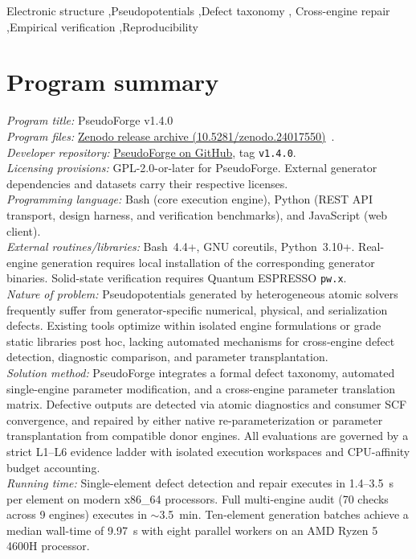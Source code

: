 \documentclass[3p,twocolumn]{elsarticle}
\begin{document}
\begin{frontmatter}
\begin{keyword}
Electronic structure \sep Pseudopotentials \sep Defect taxonomy \sep
Cross-engine repair \sep Empirical verification \sep Reproducibility
\end{keyword}
\end{frontmatter}

\section*{Program summary}
\begingroup\small\raggedright
\noindent\textit{Program title:} PseudoForge v1.4.0\\
\textit{Program files:} \href{https://doi.org/10.5281/zenodo.24017550}{Zenodo release archive (10.5281/zenodo.24017550)}~\cite{pseudoforge}.\\
\textit{Developer repository:} \href{https://github.com/MHAmirkhani/PseudoForge/tree/v1.4.0}{PseudoForge on GitHub}, tag \texttt{v1.4.0}.\\
\textit{Licensing provisions:} GPL-2.0-or-later for PseudoForge. External generator dependencies and datasets carry their respective licenses.\\
\textit{Programming language:} Bash (core execution engine), Python (REST API transport, design harness, and verification benchmarks), and JavaScript (web client).\\
\textit{External routines/libraries:} Bash~4.4+, GNU coreutils, Python~3.10+. Real-engine generation requires local installation of the corresponding generator binaries. Solid-state verification requires Quantum ESPRESSO \texttt{pw.x}.\\
\textit{Nature of problem:} Pseudopotentials generated by heterogeneous atomic solvers frequently suffer from generator-specific numerical, physical, and serialization defects. Existing tools optimize within isolated engine formulations or grade static libraries post hoc, lacking automated mechanisms for cross-engine defect detection, diagnostic comparison, and parameter transplantation.\\
\textit{Solution method:} PseudoForge integrates a formal defect taxonomy, automated single-engine parameter modification, and a cross-engine parameter translation matrix. Defective outputs are detected via atomic diagnostics and consumer SCF convergence, and repaired by either native re-parameterization or parameter transplantation from compatible donor engines. All evaluations are governed by a strict L1--L6 evidence ladder with isolated execution workspaces and CPU-affinity budget accounting.\\
\textit{Running time:} Single-element defect detection and repair executes in 1.4--3.5~s per element on modern x86\_64 processors. Full multi-engine audit (70 checks across 9 engines) executes in $\sim$3.5~min. Ten-element generation batches achieve a median wall-time of 9.97~s with eight parallel workers on an AMD Ryzen 5 4600H processor.
\par\endgroup
\end{document}
